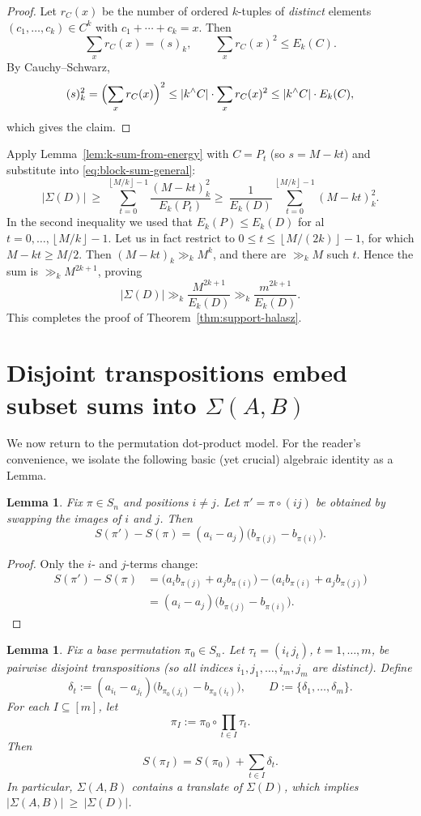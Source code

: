 \documentclass[12pt]{amsart}
\newtheorem{lemma}[theorem]{Lemma}
\theoremstyle{definition}
\theoremstyle{remark}
\newcommand{\abs}[1]{\left|#1\right|}
\newcommand{\floor}[1]{\left\lfloor #1\right\rfloor}
\newcommand{\Sig}{\Sigma}
\begin{document}
\begin{proof}
Let $r_C(x)$ be the number of ordered $k$-tuples of \emph{distinct} elements
$(c_1,\dots,c_k)\in C^k$ with $c_1+\cdots+c_k=x$. Then
\[
\sum_x r_C(x)=(s)_k,
\qquad
\sum_x r_C(x)^2 \le E_k(C).
\]
By Cauchy--Schwarz,
\[
(s)_k^2=\Bigl(\sum_x r_C(x)\Bigr)^2
\le \abs{k^{\wedge}C}\cdot \sum_x r_C(x)^2
\le \abs{k^{\wedge}C}\cdot E_k(C),
\]
which gives the claim.
\end{proof}

Apply Lemma~\ref{lem:k-sum-from-energy} with $C=P_t$ (so $s=M-kt$) and substitute into
\eqref{eq:block-sum-general}:
\[
\abs{\Sig(D)}\ \ge\ \sum_{t=0}^{\floor{M/k}-1}\frac{(M-kt)_k^2}{E_{k}(P_t)} \geq\ \frac{1}{E_k(D)}\sum_{t=0}^{\floor{M/k}-1}(M-kt)_k^2.
\]
In the second inequality we used that $E_k(P) \leq E_k(D)$ for al $t = 0,\ldots,\floor{M/k}-1$. Let us in fact restrict to $0\le t\le \floor{M/(2k)}-1$, for which $M-kt\ge M/2$. Then $(M-kt)_k\gg_k M^k$, and there
are $\gg_k M$ such $t$. Hence the sum is $\gg_k M^{2k+1}$, proving
\[
\abs{\Sig(D)}\gg_k \frac{M^{2k+1}}{E_k(D)}\gg_k \frac{m^{2k+1}}{E_k(D)}.
\]
This completes the proof of Theorem~\ref{thm:support-halasz}.

\section{Disjoint transpositions embed subset sums into $\Sig(A,B)$} \label{sec:subcube}

We now return to the permutation dot-product model. For the reader's convenience, we isolate the following basic (yet crucial) algebraic identity as a Lemma.

\begin{lemma}\label{lem:swap-increment}
Fix $\pi\in S_n$ and positions $i\neq j$. Let $\pi'=\pi\circ (ij)$ be obtained by swapping the images
of $i$ and $j$. Then
\[
S(\pi')-S(\pi)=(a_i-a_j)\bigl(b_{\pi(j)}-b_{\pi(i)}\bigr).
\]
\end{lemma}

\begin{proof}
Only the $i$- and $j$-terms change:
\begin{align*}
S(\pi')-S(\pi)
&=\bigl(a_i b_{\pi(j)}+a_j b_{\pi(i)}\bigr)-\bigl(a_i b_{\pi(i)}+a_j b_{\pi(j)}\bigr)\\
&=(a_i-a_j)\bigl(b_{\pi(j)}-b_{\pi(i)}\bigr).
\end{align*}
\end{proof}

\begin{lemma}\label{lem:disjoint-transpositions}
Fix a base permutation $\pi_0\in S_n$. Let $\tau_t=(i_t\,j_t)$, $t=1,\dots,m$, be pairwise disjoint
transpositions (so all indices $i_1,j_1,\dots,i_m,j_m$ are distinct). Define
\[
\delta_t:=(a_{i_t}-a_{j_t})\bigl(b_{\pi_0(j_t)}-b_{\pi_0(i_t)}\bigr),
\qquad
D:=\{\delta_1,\dots,\delta_m\}.
\]
For each $I\subseteq[m]$, let
\[
\pi_I:=\pi_0\circ\prod_{t\in I}\tau_t.
\]
Then
\[
S(\pi_I)=S(\pi_0)+\sum_{t\in I}\delta_t.
\]
In particular, $\Sig(A,B)$ contains a translate of $\Sig(D)$, which implies $\abs{\Sig(A,B)}\ \ge\ \abs{\Sig(D)}$.
\end{lemma}
\end{document}

